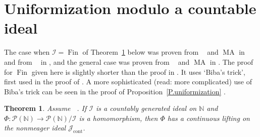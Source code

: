 \documentclass{amsart}
\def\p{{\mathcal P}}              %
\def\N{\mathbb N}                        %
\def\Fin{{\rm Fin}}   %
\newtheorem{theorem}[proposition]{Theorem}
\theoremstyle{definition}
\theoremstyle{remark}
\def\Fin{\operatorname{Fin}}
\DeclareMathOperator{\Ccont}{cont}
\newcommand{\Jcont}{\cJ_{\Ccont}}
\newcommand{\bbN}{\mathbb N}
\newcommand{\cI}{{\mathcal I}} %
\newcommand{\cJ}{{\mathcal J}} %
\DeclareMathOperator{\OCAT}{OCA_T}
\DeclareMathOperator{\MA}{MA}
\numberwithin{claim}{subsection}
\begin{document}
\section{Uniformization modulo a countable ideal}\label{S.UniformizationFin}
The case when $\cI=\Fin$ of Theorem~\ref{T.OCAsharp-Fin} below was proven from $\OCAT$ and $\MA$ in \cite{Ve:OCA} and from $\OCAT$ in \cite[Theorem~3.3]{de2023trivial}, and the general case was proven from $\OCAT$ and $\MA$ in \cite[Theorem~1.9.2]{Fa:AQ}.  The proof for $\Fin$ given here is slightly shorter than the proof in \cite{de2023trivial}. It uses `Biba’s trick’, first used in the proof of \cite[Proposition~5.6]{de2023trivial}. A more sophisticated (read: more complicated) use of Biba’s trick can be seen in the proof of Proposition~\ref{P.uniformization}  .




\begin{theorem} \label{T.OCAsharp-Fin}
	Assume  $\OCAT$.  If $\cI$ is a countably generated ideal on $\bbN$ and 
	$\Phi\colon \p(\N)\to \p(\N)/\cI$
	is a  homomorphism, then $\Phi$ has a continuous lifting on the nonmeager ideal $\Jcont$.  
\end{theorem}


\end{document}
